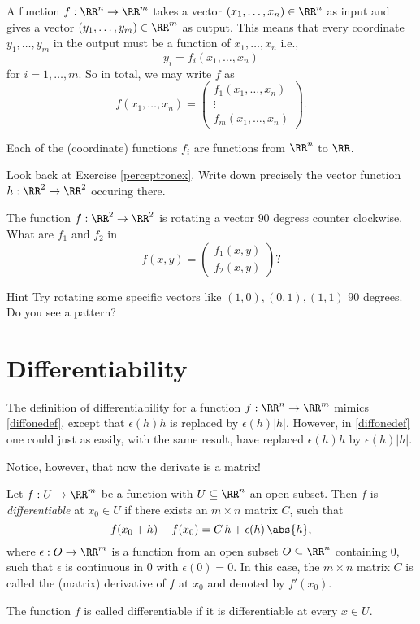 \documentclass{article}
\begin{document}
A function $f:\RR^n\rightarrow \RR^m$ takes a vector
$(x_1, \dots, x_n)\in \RR^n$ as input and gives a
vector $(y_1, \dots, y_m)\in \RR^m$ as output. This means
that every coordinate $y_1, \dots, y_m$ in the output
must be a function of $x_1, \dots, x_n$ i.e.,
$$
y_i = f_i(x_1, \dots, x_n)
$$
for $i = 1, \dots, m$. So in total, we may write $f$ as
\begin{equation}\label{sevformat}
f(x_1, \dots, x_n) =
\begin{pmatrix}
  f_1(x_1, \dots, x_n)\\
  \vdots \\
  f_m(x_1, \dots, x_n)
\end{pmatrix}.
\end{equation}

Each of the (coordinate) functions $f_i$ are functions from
$\RR^n$ to $\RR$.

\beginshex
Look back at Exercise \ref{perceptronex}. Write down precisely the
vector function $h:\RR^2\rightarrow \RR^2$ occuring there.
\endshex

\beginshex\label{rotate90ex}
The function $f:\RR^2\rightarrow \RR^2$ is rotating
a vector $90$ degress counter clockwise. What are
$f_1$ and $f_2$ in
$$
f(x, y) =
\begin{pmatrix}
  f_1(x, y)\\
  f_2(x, y)
\end{pmatrix}?
$$
\begin{hideinbutton}{Hint}
Try rotating some specific vectors like $(1, 0), (0, 1), (1, 1)$ $90$ degrees.
Do you see a pattern?
\end{hideinbutton}
\endshex

\section{Differentiability}

The definition of differentiability for a function
$f:\RR^n\rightarrow \RR^m$ mimics \eqref{diffonedef}, except
that $\epsilon(h) h$ is replaced by $\epsilon(h) |h|$. However,
in \eqref{diffonedef} one could just as easily, with the same
result, have replaced $\epsilon(h) h$ by $\epsilon(h) |h|$.

Notice, however, that now the derivate is a matrix!

\begin{definition}[emph]\label{diffdef}
Let $f:U\rightarrow \RR^m$ be a
  function with $U\subseteq \RR^n$ an open subset.  Then $f$ is
  \emph{differentiable} at $x_0\in U$ if there exists an $m\times n$
  matrix $C$, such that
  $$
    f(x_0 + h) - f(x_0) = C\, h + \epsilon(h)\, \abs{ h },
  $$
  where $\epsilon:O\rightarrow \RR^m$ is a function from an open
  subset $O\subseteq \RR^n$ containing $0$, such that $\epsilon$ is
  continuous in $0$ with $\epsilon(0) = 0$. In this case,
  the $m\times n$ matrix $C$ is called the (matrix) derivative of
  $f$ at $x_0$ and denoted by $f'(x_0)$.

  The function $f$ is called
  differentiable if it is differentiable at every $x\in U$.
\end{definition}
\end{document}
